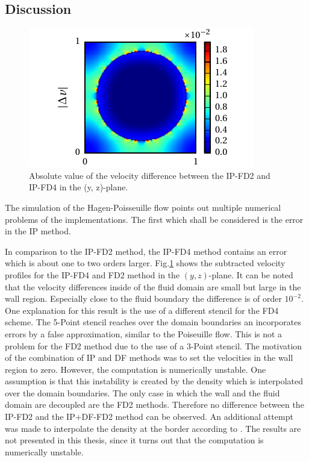 \clearpage

\subsection{Discussion}

\label{sec:hpflow_discussion}

\begin{figure}[!bp]
  \begin{minipage}[c]{0.4\textwidth}
      \centering
      \includegraphics{gfx/immersed_boundary/hpflow/discussion/vzdiff.pdf}
  \end{minipage}
  \begin{minipage}[c]{0.6\textwidth}
      \caption{Absolute value of the velocity difference between the IP-FD2 and IP-FD4 in the (y, z)-plane.
      \label{valid:hpflow_velodiff_discussion}
      }
  \end{minipage}
\end{figure}

The simulation of the Hagen-Poisseuille flow points out multiple numerical problems of the
implementations.
The first which shall be considered is the error in the IP method.


In comparison to the  IP-FD2 method, the IP-FD4 method contains an error which is about one to two orders larger.
Fig.\ref{valid:hpflow_velodiff_discussion} shows the subtracted velocity profiles for the IP-FD4 and FD2 method in the $(y, z)$-plane.
It can be noted that the velocity differences inside of the fluid domain are small but large in the wall region.
Especially close to the fluid boundary the difference  is of order $10^{-2}$.
One explanation for this result is the use of a different stencil for the FD4 scheme.
The 5-Point stencil reaches over the domain boundaries an incorporates errors by a false approximation, similar to the Poiseuille flow.
This is not a problem for the FD2 method due to the use of a 3-Point stencil.
The motivation of the combination of IP and DF methods was to set the velocities in the wall region to zero.
However, the computation is numerically unstable.
One assumption is that this instability is created by the density which is interpolated over the domain boundaries.
The only case in which the wall and the fluid domain are decoupled are the FD2 methods.
Therefore no difference between the IP-FD2 and the IP+DF-FD2 method can be observed.
An additional attempt was made to interpolate the density at the border according to \citep{Gilmanov2003}.
The results are not presented in this thesis, since it turns out that the computation is numerically unstable.

